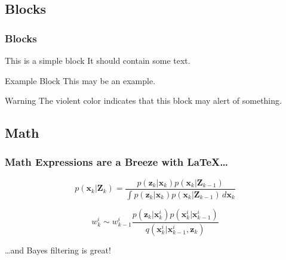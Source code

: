 \documentclass{beamer}
\begin{document}
\subsection{Blocks}
\begin{frame}
   \frametitle{Blocks}

   \begin{block}{This is a simple block}
      It should contain some text.
   \end{block}

   \begin{exampleblock}{Example Block}
      This may be an example.
   \end{exampleblock}


   \begin{alertblock}{Warning}
      The violent color indicates that this block may alert of something.
   \end{alertblock}
\end{frame}



\subsection{Math} 
\begin{frame}
   \frametitle{Math Expressions are a Breeze with \LaTeX \ldots}

   \begin{equation}
      p(\mathbf{x}_{k}|\mathbf{Z}_{k}) = \frac{p(\mathbf{z}_{k}|\mathbf{x     }_{k})p(\mathbf{x}_{k}|\mathbf{Z}_{k-1})}{\int \! p(\mathbf{z}_{k}|\mathbf{     x}_{k})p(\mathbf{x}_{k}|\mathbf{Z}_{k-1})\,d\mathbf{x}_{k}}
   \end{equation}

   \begin{equation}
      w_{k}^{i} \sim w_{k-1}^{i}\frac{p(\mathbf{z}_{k}|\mathbf{x}_{k}^{i})p(\mathbf{x}_{k}^{i}|\mathbf{x}_{k-1}^{i})}{q(\mathbf{x}_{k}^{i}|\mathbf{x}_{k-1}^{i},\mathbf{z}_{k})}
   \end{equation}

   \ldots and Bayes filtering is great!

\end{frame}
\end{document}
